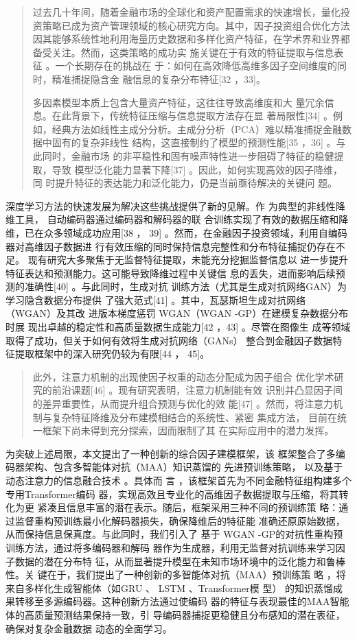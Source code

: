 \documentclass[UTF8]{ctexart}
\begin{document}
\begin{quote}
过去几十年间，随着金融市场的全球化和资产配置需求的快速增长，量化投资策略已成为资产管理领域的核心研究方向。其中，因子投资组合优化方法因其能够系统性地利用海量历史数据和多样化资产特征，在学术界和业界都备受关注。然而，这类策略的成功实
施关键在于有效的特征提取与信息表征 。一个长期存在的挑战在
于：如何在高效降低高维多因子空间维度的同时，精准捕捉隐含金
融信息的复杂分布特征{[}32 ，33{]}。

多因素模型本质上包含大量资产特征，这往往导致高维度和大
量冗余信息。在此背景下，传统特征压缩与信息提取方法存在显
著局限性{[}34{]}
。例如，经典方法如线性主成分分析。主成分分析（PCA）难以精准捕捉金融数据中固有的复杂非线性
结构，这直接制约了模型的预测性能{[}35 ，36{]} 。与此同时，金融市场
的非平稳性和固有噪声特性进一步阻碍了特征的稳健提取，导致
模型泛化能力显著下降{[}37{]} 。因此，如何实现高效的因子降维， 同
时提升特征的表达能力和泛化能力，仍是当前亟待解决的关键问 题。
\end{quote}

深度学习方法的快速发展为解决这些挑战提供了新的见解。作
为典型的非线性降维工具， 自动编码器通过编码器和解码器的联
合训练实现了有效的数据压缩和降维，已在众多领域成功应用{[}38 ， 39{]}
。然而，在金融因子投资领域，利用自编码器对高维因子数据进
行有效压缩的同时保持信息完整性和分布特征捕捉仍存在不足。
现有研究大多聚焦于无监督特征提取，未能充分挖掘监督信息以
进一步提升特征表达和预测能力。这可能导致降维过程中关键信
息的丢失，进而影响后续预测的准确性{[}40{]} 。与此同时，生成对抗
训练方法（尤其是生成对抗网络GAN）为学习隐含数据分布提供
了强大范式{[}41{]} 。其中，瓦瑟斯坦生成对抗网络（WGAN）及其改
进版本梯度惩罚 WGAN（WGAN -GP）在建模复杂数据分布时展
现出卓越的稳定性和高质量数据生成能力{[}42 ，43{]} 。尽管在图像生
成等领域取得了成功，但关于如何有效将生成对抗网络（GANs）
整合到金融因子数据特征提取框架中的深入研究仍较为有限{[}44 ， 45{]}。

\begin{quote}
此外，注意力机制的出现使因子权重的动态分配成为因子组合
优化学术研究的前沿课题{[}46{]} 。现有研究表明，注意力机制能有效
识别并凸显因子间的差异重要性，从而提升组合预测与优化的效 能{[}47{]}
。然而，将注意力机制与复杂特征降维及分布建模相结合的系统性、紧密
集成方法， 目前在统一框架下尚未得到充分探索，因而限制了其
在实际应用中的潜力发挥。
\end{quote}

为突破上述局限，本文提出了一种创新的综合因子建模框架，该
框架整合了多编码器架构、包含多智能体对抗（MAA）知识蒸馏的
先进预训练策略， 以及基于动态注意力的信息融合技术 。具体而 言
，该框架首先为不同金融特征组构建多个专用Transformer编码
器，实现高效且专业化的高维因子数据提取与压缩，将其转化为更
紧凑且信息丰富的潜在表示。随后，框架采用三种不同的预训练策
略：通过监督重构预训练最小化解码器损失，确保降维后的特征能
准确还原原始数据，从而保持信息保真度。与此同时，我们引入了 基于 WGAN
-GP的对抗性重构预训练方法，通过将多编码器和解码
器作为生成器，利用无监督对抗训练来学习因子数据的潜在分布特
征，从而显著提升模型在未知市场环境中的泛化能力和鲁棒性。关
键在于，我们提出了一种创新的多智能体对抗（MAA）预训练策 略
，将来自多样化生成智能体（如GRU 、 LSTM 、Transformer模 型）
的知识蒸馏成果转移至多源编码器。这种创新方法通过使编码
器的特征与表现最佳的MAA智能体的高质量预测结果保持一致，引
导编码器捕捉更稳健且分布感知的潜在表征，确保对复杂金融数据
动态的全面学习。
\end{document}
